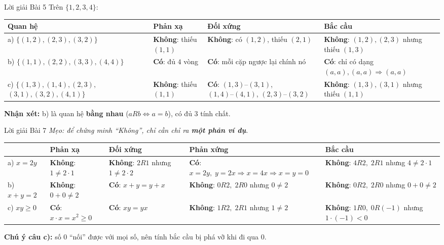 \documentclass[12pt,a4paper]{article}
\newcommand{\yes}{\textcolor{AccentGreen}{\textbf{Có}}}
\newcommand{\no}{\textcolor{AccentRed}{\textbf{Không}}}
\begin{document}
\begin{baitap}{Lời giải Bài 5}
Trên $\{1, 2, 3, 4\}$:
\begin{center}
\renewcommand{\arraystretch}{1.25}
\small
\begin{tabular}{@{} >{\raggedright\arraybackslash}p{4.3cm} >{\raggedright\arraybackslash}p{2.7cm} >{\raggedright\arraybackslash}p{3.6cm} >{\raggedright\arraybackslash}p{3.9cm} @{}}
\toprule
\textbf{Quan hệ} & \textbf{Phản xạ} & \textbf{Đối xứng} & \textbf{Bắc cầu} \\
\midrule
a) $\{(1,2), (2,3), (3,2)\}$ &
\no: thiếu $(1,1)$ &
\no: có $(1,2)$, thiếu $(2,1)$ &
\no: $(1,2), (2,3)$ nhưng thiếu $(1,3)$ \\
b) $\{(1,1), (2,2), (3,3), (4,4)\}$ &
\yes: đủ $4$ vòng &
\yes: mỗi cặp ngược lại chính nó &
\yes: chỉ có dạng $(a,a), (a,a) \Rightarrow (a,a)$ \\
c) $\{(1,3), (1,4), (2,3),$ $(3,1), (3,2), (4,1)\}$ &
\no: thiếu $(1,1)$ &
\yes: $(1,3)\text{--}(3,1)$, $(1,4)\text{--}(4,1)$, $(2,3)\text{--}(3,2)$ &
\no: $(1,3), (3,1)$ nhưng thiếu $(1,1)$ \\
\bottomrule
\end{tabular}
\end{center}
\textbf{Nhận xét:} b) là quan hệ \textbf{bằng nhau} ($aRb \iff a = b$), có đủ $3$ tính chất.
\end{baitap}

\begin{baitap}{Lời giải Bài 7}
\textit{Mẹo: để chứng minh ``Không'', chỉ cần chỉ ra \textbf{một phản ví dụ}.}
\begin{center}
\renewcommand{\arraystretch}{1.25}
\small
\begin{tabular}{@{} >{\raggedright\arraybackslash}p{2.0cm} >{\raggedright\arraybackslash}p{2.6cm} >{\raggedright\arraybackslash}p{2.7cm} >{\raggedright\arraybackslash}p{3.3cm} >{\raggedright\arraybackslash}p{3.4cm} @{}}
\toprule
 & \textbf{Phản xạ} & \textbf{Đối xứng} & \textbf{Phản xứng} & \textbf{Bắc cầu} \\
\midrule
a) $x = 2y$ &
\no: $1 \neq 2 \cdot 1$ &
\no: $2R1$ nhưng $1 \neq 2 \cdot 2$ &
\yes: $x=2y,\; y=2x \Rightarrow x=4x \Rightarrow x=y=0$ &
\no: $4R2,\; 2R1$ nhưng $4 \neq 2 \cdot 1$ \\
b) $x + y = 2$ &
\no: $0 + 0 \neq 2$ &
\yes: $x + y = y + x$ &
\no: $0R2,\; 2R0$ nhưng $0 \neq 2$ &
\no: $0R2,\; 2R0$ nhưng $0 + 0 \neq 2$ \\
c) $xy \ge 0$ &
\yes: $x \cdot x = x^2 \ge 0$ &
\yes: $xy = yx$ &
\no: $1R2,\; 2R1$ nhưng $1 \neq 2$ &
\no: $1R0,\; 0R(-1)$ nhưng $1 \cdot (-1) < 0$ \\
\bottomrule
\end{tabular}
\end{center}
\vspace{3pt}
\textbf{Chú ý câu c):} số $0$ ``nối'' được với mọi số, nên tính bắc cầu bị phá vỡ khi đi qua $0$.
\end{baitap}
\end{document}
